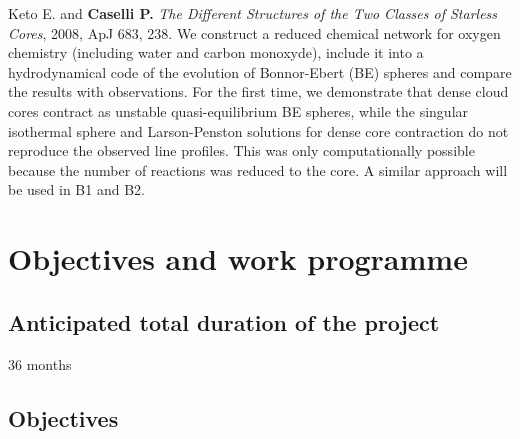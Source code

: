 \documentclass[10pt,fleqn,twoside]{article}
\begin{document}
\begin{literature}
\item Keto E. and \textbf{Caselli P.}  \textit{The Different Structures of the Two Classes of Starless Cores}, 2008, ApJ
  683, 238. We construct a reduced chemical network for oxygen chemistry
   (including water and carbon monoxyde), include it into a
   hydrodynamical code of the evolution of Bonnor-Ebert (BE) spheres
   and compare the results with observations.  For the first time, we
   demonstrate that dense cloud cores contract as unstable
   quasi-equilibrium BE spheres, while the singular isothermal sphere
   and Larson-Penston solutions for dense core contraction do not
   reproduce the observed line profiles.  This was only
   computationally possible
   because the number of reactions was reduced to the core. A similar
   approach will be used in B1 and B2. 

\end{literature}


% 
% 
% 
% 
% 

\section{Objectives and work programme}
\renewcommand{\leftmark}{\sc Objectives and work programme}


\subsection{Anticipated total duration of the project}

36 months

\subsection{Objectives}
\end{document}
